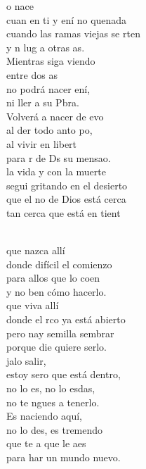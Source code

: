 \documentclass[12pt]{article}
\begin{document}
\begin{multicols*}{2}
\begin{cancion}%
	o nace  \\
	cuan en ti y ení no quenada\\
	cuando las ramas viejas se rten\\
	y n lug a otras as.\\
	Mientras siga viendo   \\
	entre dos as \\
	no podrá nacer ení,\\
	ni ller a  su Pbra. \\
	Volverá a nacer de evo\\
	al der todo anto po, \\
	al vivir en libert\\
	para r de Ds su mensao.\\
	 la vida y con la muerte\\
	segui gritando en el desierto  \\
	que el no de Dios está cerca\\
	tan cerca que está en tient\\\jump\\
	\begin{chorus}%
	 que nazca allí\\
	donde  difícil el comienzo\\
	para allos que lo coen\\
	y no ben cómo hacerlo.\\
	 que viva allí\\
	donde el rco ya está abierto\\
	pero nay semilla  sembrar\\
	porque die quiere serlo.\\
	jalo salir,\\
	estoy sero que está dentro,\\
	no lo es, no lo esdas,\\
	no te ngues a tenerlo.\\
	Es naciendo aquí,\\
	no lo des, es tremendo\\
	que te a que le aes\\
	para har un mundo nuevo.\\
	\end{chorus}%
	\jump\\
\end{cancion}%


\end{multicols*}
\end{document}
